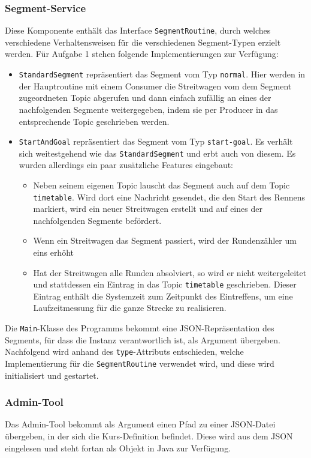 \documentclass[12pt]{article}
\begin{document}
\subsubsection*{Segment-Service}
Diese Komponente enthält das Interface \texttt{SegmentRoutine}, durch welches verschiedene Verhaltensweisen für die verschiedenen Segment-Typen erzielt werden.
Für Aufgabe 1 stehen folgende Implementierungen zur Verfügung:
\begin{itemize}
	\item \texttt{StandardSegment} repräsentiert das Segment vom Typ \texttt{normal}.
	Hier werden in der Hauptroutine mit einem Consumer die Streitwagen vom dem Segment zugeordneten Topic abgerufen und dann einfach zufällig an eines der nachfolgenden Segmente weitergegeben, indem sie per Producer in das entsprechende Topic geschrieben werden.
	
	\item \texttt{StartAndGoal} repräsentiert das Segment vom Typ \texttt{start-goal}.
	Es verhält sich weitestgehend wie das \texttt{StandardSegment} und erbt auch von diesem.
	Es wurden allerdings ein paar zusätzliche Features eingebaut:
	\begin{itemize}
		\item Neben seinem eigenen Topic lauscht das Segment auch auf dem Topic \texttt{timetable}.
		Wird dort eine Nachricht gesendet, die den Start des Rennens markiert, wird ein neuer Streitwagen erstellt und auf eines der nachfolgenden Segmente befördert.
		
		\item Wenn ein Streitwagen das Segment passiert, wird der Rundenzähler um eins erhöht
		
		\item Hat der Streitwagen alle Runden absolviert, so wird er nicht weitergeleitet und stattdessen ein Eintrag in das Topic \texttt{timetable} geschrieben.
		Dieser Eintrag enthält die Systemzeit zum Zeitpunkt des Eintreffens, um eine Laufzeitmessung für die ganze Strecke zu realisieren.
	\end{itemize}
\end{itemize}
Die \texttt{Main}-Klasse des Programms bekommt eine JSON-Repräsentation des Segments, für dass die Instanz verantwortlich ist, als Argument übergeben.
Nachfolgend wird anhand des \texttt{type}-Attributs entschieden, welche Implementierung für die \texttt{SegmentRoutine} verwendet wird, und diese wird initialisiert und gestartet.

\subsubsection*{Admin-Tool}
Das Admin-Tool bekommt als Argument einen Pfad zu einer JSON-Datei übergeben, in der sich die Kurs-Definition befindet.
Diese wird aus dem JSON eingelesen und steht fortan als Objekt in Java zur Verfügung.
\end{document}
